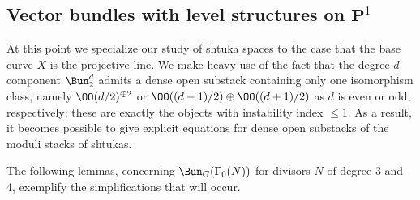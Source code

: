 \documentclass{article}
\begin{document}





\subsection{Vector bundles with level structures on $\mathbf{P}^1$}
\label{SectionShtukasOverP1}
At this point we specialize our study of shtuka spaces to the case that the base curve $X$ is the projective line.  We make heavy use of the fact that the degree $d$ component $\Bun_2^d$ admits a dense open substack containing only one isomorphism class, namely $\OO(d/2)^{\oplus 2}$ or $\OO((d-1)/2)\oplus \OO((d+1)/2)$ as $d$ is even or odd, respectively;  these are exactly the objects with instability index $\leq 1$.   As a result, it becomes possible to give explicit equations for dense open substacks of the moduli stacks of shtukas.  

The following lemmas, concerning $\Bun_G(\Gamma_0(N))$ for divisors $N$ of degree 3 and 4, exemplify the simplifications that will occur.
\end{document}
